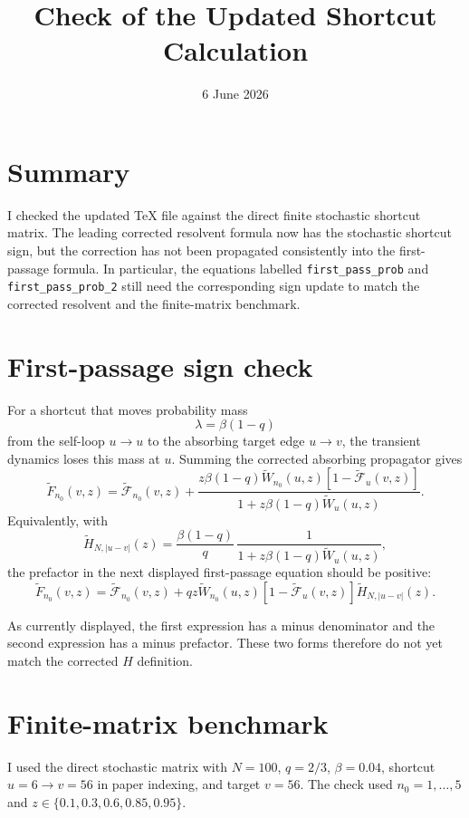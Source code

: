 \documentclass[11pt]{article}
\title{Check of the Updated Shortcut Calculation}
\author{}
\date{6 June 2026}
\begin{document}
\maketitle

\section*{Summary}

I checked the updated TeX file against the direct finite stochastic shortcut
matrix. The leading corrected resolvent formula now has the stochastic
shortcut sign, but the correction has not been propagated consistently into
the first-passage formula. In particular, the equations labelled
\texttt{first\_pass\_prob} and \texttt{first\_pass\_prob\_2} still need the
corresponding sign update to match the corrected resolvent and the finite-matrix
benchmark.

\section*{First-passage sign check}

For a shortcut that moves probability mass
\[
  \lambda=\beta(1-q)
\]
from the self-loop \(u\to u\) to the absorbing target edge \(u\to v\), the
transient dynamics loses this mass at \(u\). Summing the corrected absorbing
propagator gives
\[
  \widetilde F_{n_0}(v,z)=
  \widetilde{\mathcal F}_{n_0}(v,z)
  +\frac{
    z\beta(1-q)\widetilde W_{n_0}(u,z)
    \left[1-\widetilde{\mathcal F}_{u}(v,z)\right]
  }{
    1+z\beta(1-q)\widetilde W_{u}(u,z)
  }.
\]
Equivalently, with
\[
  \widetilde H_{N,|u-v|}(z)
  =\frac{\beta(1-q)}{q}\,
  \frac{1}{1+z\beta(1-q)\widetilde W_u(u,z)},
\]
the prefactor in the next displayed first-passage equation should be positive:
\[
  \widetilde F_{n_0}(v,z)=
  \widetilde{\mathcal F}_{n_0}(v,z)
  +qz\widetilde W_{n_0}(u,z)
  \left[1-\widetilde{\mathcal F}_{u}(v,z)\right]
  \widetilde H_{N,|u-v|}(z).
\]

As currently displayed, the first expression has a minus denominator and the
second expression has a minus prefactor. These two forms therefore do not yet
match the corrected \(H\) definition.

\section*{Finite-matrix benchmark}

I used the direct stochastic matrix with \(N=100\), \(q=2/3\),
\(\beta=0.04\), shortcut \(u=6\to v=56\) in paper indexing, and target
\(v=56\). The check used \(n_0=1,\ldots,5\) and
\(z\in\{0.1,0.3,0.6,0.85,0.95\}\).
\end{document}
